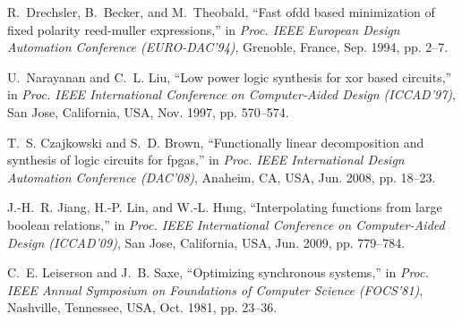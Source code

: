 \documentclass[journal]{IEEEtran}
\begin{document}
\begin{thebibliography}{49}
R.~Drechsler, B.~Becker, and M.~Theobald, ``Fast ofdd based minimization of
  fixed polarity reed-muller expressions,'' in \emph{Proc. {IEEE} European
  Design Automation Conference ({EURO-DAC}'94)}, Grenoble, France, Sep. 1994,
  pp. 2--7.

U.~Narayanan and C.~L. Liu, ``Low power logic synthesis for xor based
  circuits,'' in \emph{Proc. {IEEE} International Conference on Computer-Aided
  Design ({ICCAD}'97)}, San Jose, California, USA, Nov. 1997, pp. 570--574.

T.~S. Czajkowski and S.~D. Brown, ``Functionally linear decomposition and
  synthesis of logic circuits for fpgas,'' in \emph{Proc. {IEEE} International
  Design Automation Conference ({DAC}'08)}, Anaheim, CA, USA, Jun. 2008, pp.
  18--23.

J.-H.~R. Jiang, H.-P. Lin, and W.-L. Hung, ``Interpolating functions from large
  boolean relations,'' in \emph{Proc. {IEEE} International Conference on
  Computer-Aided Design ({ICCAD}'09)}, San Jose, California, USA, Jun. 2009,
  pp. 779--784.

C.~E. Leiserson and J.~B. Saxe, ``Optimizing synchronous systems,'' in
  \emph{Proc. {IEEE} Annual Symposium on Foundations of Computer Science
  ({FOCS}'81)}, Nashville, Tennessee, USA, Oct. 1981, pp. 23--36.

\end{thebibliography}


%

\end{document}
